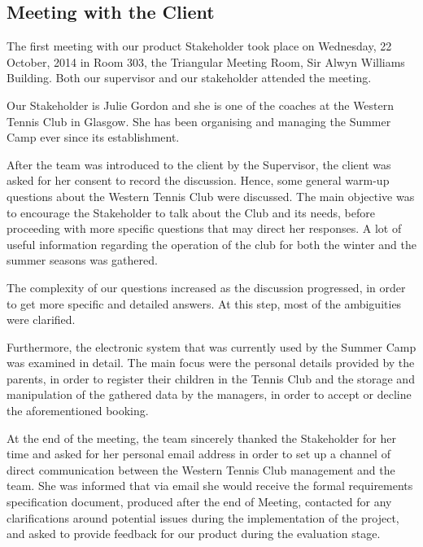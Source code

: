 \documentclass{l3proj}
\begin{document}
\subsection{Meeting with the Client}
\par
The first meeting with our product Stakeholder took place on Wednesday, 22 October, 2014 in Room 303, the Triangular Meeting Room, Sir Alwyn Williams Building. Both our supervisor and our stakeholder attended the meeting.\\
\par Our Stakeholder is Julie Gordon and she is one of the coaches at the Western Tennis Club in Glasgow. She has been organising and managing the Summer Camp ever since its establishment.\\
\par After the team was introduced to the client by the Supervisor, the client was asked for her consent to record the discussion. Hence,  some general warm-up questions about the Western Tennis Club were discussed. The main objective was to encourage the Stakeholder to talk about the Club and its needs, before proceeding with more specific questions that may direct her responses. A lot of useful information regarding the operation of the club for both the winter and the summer seasons was gathered.\\
\par The complexity of our questions increased as the discussion progressed, in order to get more specific and detailed answers. At this step, most of the ambiguities were clarified.\\
\par Furthermore,  the electronic system that was currently used by the Summer Camp was examined in detail. The main focus were the personal details provided by the parents, in order to register their children in the Tennis Club and the storage and manipulation of the gathered data by the managers, in order to accept or decline the aforementioned booking.\\
\par At the end of the meeting, the team sincerely thanked the Stakeholder for her time and asked for her personal email address in order to set up a channel of direct communication between the Western Tennis Club management and the team. She was informed that via email she would receive the formal requirements specification document, produced after the end of Meeting, contacted for any clarifications around potential issues during the implementation of the project, and  asked to provide feedback for our product during the evaluation stage.
\end{document}
